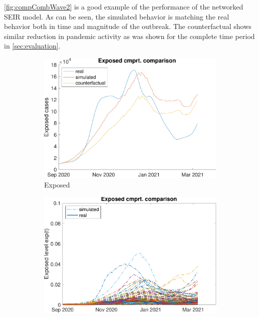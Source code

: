 \autoref{fig:compCombWave2} is a good example of the performance of the networked SEIR model. As can be seen, the simulated behavior is matching the real behavior both in time and magnitude of the outbreak. The counterfactual shows similar reduction in pandemic activity as was shown for the complete time period in \autoref{sec:evaluation}.

\begin{figure}[hbtp]
     \centering
     \begin{subfigure}[b]{.45\linewidth}
         \centering
         \includegraphics[width=\linewidth]{img/210907_223108_combined_wave2/figures/COMP_exp}
         \caption{Exposed}
         \label{fig:compAggrCombWave2Exp}
     \end{subfigure}
     \hfill
     \begin{subfigure}[b]{.45\linewidth}
         \centering
         \includegraphics[width=\linewidth]{img/210907_223108_combined_wave2/figures/SEIR_e_sim-vs-real}

\end{subfigure}
\end{figure}
